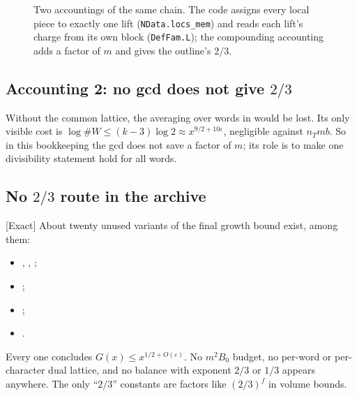 \documentclass[11pt]{article}
\newcommand{\Exact}{\textcolor{exactc}{\textsf{\small[Exact]}}}
\newcommand{\eps}{\varepsilon}
\theoremstyle{plain}
\theoremstyle{definition}
\begin{document}
\begin{figure}[ht]
\centering
{}
\caption{Two accountings of the same chain. The code assigns every local piece to exactly one lift
(\texttt{NData.locs\_mem}) and reads each lift's charge from its own block (\texttt{DefFam.L}); the
compounding accounting adds a factor of $m$ and gives the outline's $2/3$.}\label{fig:compound}
\end{figure}



\subsection{Accounting 2: no gcd does not give $2/3$}

Without the common lattice, the averaging over words in  would be lost. Its only
visible cost is $\log\#W\le(k-3)\log2\approx x^{9/2+10\eps}$, negligible against $n_Tmb$. So in this
bookkeeping the gcd does not save a factor of $m$; its role is to make one divisibility statement
hold for all words.

\subsection{No $2/3$ route in the archive}\label{sec:no23}

\Exact{} About twenty unused variants of the final growth bound exist, among them:
\begin{itemize}
\item {}, , ;
\item {};
\item {};
\item {}.
\end{itemize}
Every one concludes $G(x)\le x^{1/2+O(\eps)}$. No
$m^2B_0$ budget, no per-word or per-character dual lattice, and no balance with exponent $2/3$ or
$1/3$ appears anywhere. The only ``$2/3$'' constants are factors like $(2/3)^f$ in volume bounds.
\end{document}
